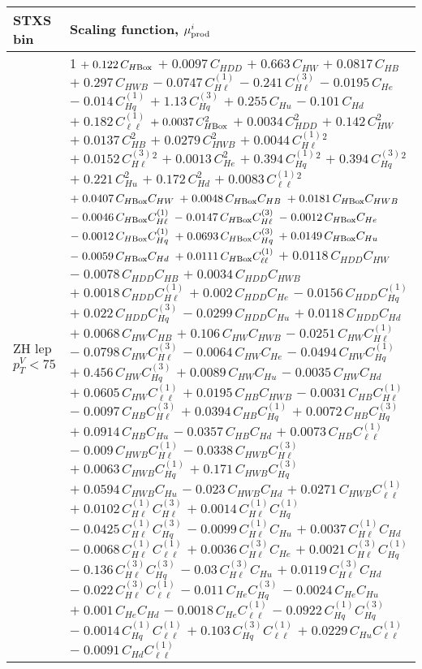 \begin{tabular}{l|p{}}
    STXS bin & Scaling function, $\mu^i_{\rm{prod}}$ \\ \hline
    ZH lep $p_{T}^{V} < 75$ & 1 $+\;0.122\,C_{H\rm{Box}}$ $+\;0.0097\,C_{HDD}$ $+\;0.663\,C_{HW}$ $+\;0.0817\,C_{HB}$ $+\;0.297\,C_{HWB}$ $-\;0.0747\,C^{(1)}_{H\ell}$ $-\;0.241\,C^{(3)}_{H\ell}$ $-\;0.0195\,C_{He}$ $-\;0.014\,C^{(1)}_{Hq}$ $+\;1.13\,C^{(3)}_{Hq}$ $+\;0.255\,C_{Hu}$ $-\;0.101\,C_{Hd}$ $+\;0.182\,C^{(1)}_{\ell\ell}$ $+\;0.0037\,C_{H\rm{Box}}^{2}$ $+\;0.0034\,C_{HDD}^{2}$ $+\;0.142\,C_{HW}^{2}$ $+\;0.0137\,C_{HB}^{2}$ $+\;0.0279\,C_{HWB}^{2}$ $+\;0.0044\,C^{(1)}_{H\ell}^{2}$ $+\;0.0152\,C^{(3)}_{H\ell}^{2}$ $+\;0.0013\,C_{He}^{2}$ $+\;0.394\,C^{(1)}_{Hq}^{2}$ $+\;0.394\,C^{(3)}_{Hq}^{2}$ $+\;0.221\,C_{Hu}^{2}$ $+\;0.172\,C_{Hd}^{2}$ $+\;0.0083\,C^{(1)}_{\ell\ell}^{2}$ $+\;0.0407\,C_{H\rm{Box}}C_{HW}$ $+\;0.0048\,C_{H\rm{Box}}C_{HB}$ $+\;0.0181\,C_{H\rm{Box}}C_{HWB}$ $-\;0.0046\,C_{H\rm{Box}}C^{(1)}_{H\ell}$ $-\;0.0147\,C_{H\rm{Box}}C^{(3)}_{H\ell}$ $-\;0.0012\,C_{H\rm{Box}}C_{He}$ $-\;0.0012\,C_{H\rm{Box}}C^{(1)}_{Hq}$ $+\;0.0693\,C_{H\rm{Box}}C^{(3)}_{Hq}$ $+\;0.0149\,C_{H\rm{Box}}C_{Hu}$ $-\;0.0059\,C_{H\rm{Box}}C_{Hd}$ $+\;0.0111\,C_{H\rm{Box}}C^{(1)}_{\ell\ell}$ $+\;0.0118\,C_{HDD}C_{HW}$ $-\;0.0078\,C_{HDD}C_{HB}$ $+\;0.0034\,C_{HDD}C_{HWB}$ $+\;0.0018\,C_{HDD}C^{(1)}_{H\ell}$ $+\;0.002\,C_{HDD}C_{He}$ $-\;0.0156\,C_{HDD}C^{(1)}_{Hq}$ $+\;0.022\,C_{HDD}C^{(3)}_{Hq}$ $-\;0.0299\,C_{HDD}C_{Hu}$ $+\;0.0118\,C_{HDD}C_{Hd}$ $+\;0.0068\,C_{HW}C_{HB}$ $+\;0.106\,C_{HW}C_{HWB}$ $-\;0.0251\,C_{HW}C^{(1)}_{H\ell}$ $-\;0.0798\,C_{HW}C^{(3)}_{H\ell}$ $-\;0.0064\,C_{HW}C_{He}$ $-\;0.0494\,C_{HW}C^{(1)}_{Hq}$ $+\;0.456\,C_{HW}C^{(3)}_{Hq}$ $+\;0.0089\,C_{HW}C_{Hu}$ $-\;0.0035\,C_{HW}C_{Hd}$ $+\;0.0605\,C_{HW}C^{(1)}_{\ell\ell}$ $+\;0.0195\,C_{HB}C_{HWB}$ $-\;0.0031\,C_{HB}C^{(1)}_{H\ell}$ $-\;0.0097\,C_{HB}C^{(3)}_{H\ell}$ $+\;0.0394\,C_{HB}C^{(1)}_{Hq}$ $+\;0.0072\,C_{HB}C^{(3)}_{Hq}$ $+\;0.0914\,C_{HB}C_{Hu}$ $-\;0.0357\,C_{HB}C_{Hd}$ $+\;0.0073\,C_{HB}C^{(1)}_{\ell\ell}$ $-\;0.009\,C_{HWB}C^{(1)}_{H\ell}$ $-\;0.0338\,C_{HWB}C^{(3)}_{H\ell}$ $+\;0.0063\,C_{HWB}C^{(1)}_{Hq}$ $+\;0.171\,C_{HWB}C^{(3)}_{Hq}$ $+\;0.0594\,C_{HWB}C_{Hu}$ $-\;0.023\,C_{HWB}C_{Hd}$ $+\;0.0271\,C_{HWB}C^{(1)}_{\ell\ell}$ $+\;0.0102\,C^{(1)}_{H\ell}C^{(3)}_{H\ell}$ $+\;0.0014\,C^{(1)}_{H\ell}C^{(1)}_{Hq}$ $-\;0.0425\,C^{(1)}_{H\ell}C^{(3)}_{Hq}$ $-\;0.0099\,C^{(1)}_{H\ell}C_{Hu}$ $+\;0.0037\,C^{(1)}_{H\ell}C_{Hd}$ $-\;0.0068\,C^{(1)}_{H\ell}C^{(1)}_{\ell\ell}$ $+\;0.0036\,C^{(3)}_{H\ell}C_{He}$ $+\;0.0021\,C^{(3)}_{H\ell}C^{(1)}_{Hq}$ $-\;0.136\,C^{(3)}_{H\ell}C^{(3)}_{Hq}$ $-\;0.03\,C^{(3)}_{H\ell}C_{Hu}$ $+\;0.0119\,C^{(3)}_{H\ell}C_{Hd}$ $-\;0.022\,C^{(3)}_{H\ell}C^{(1)}_{\ell\ell}$ $-\;0.011\,C_{He}C^{(3)}_{Hq}$ $-\;0.0024\,C_{He}C_{Hu}$ $+\;0.001\,C_{He}C_{Hd}$ $-\;0.0018\,C_{He}C^{(1)}_{\ell\ell}$ $-\;0.0922\,C^{(1)}_{Hq}C^{(3)}_{Hq}$ $-\;0.0014\,C^{(1)}_{Hq}C^{(1)}_{\ell\ell}$ $+\;0.103\,C^{(3)}_{Hq}C^{(1)}_{\ell\ell}$ $+\;0.0229\,C_{Hu}C^{(1)}_{\ell\ell}$ $-\;0.0091\,C_{Hd}C^{(1)}_{\ell\ell}$ \\

\end{tabular}
